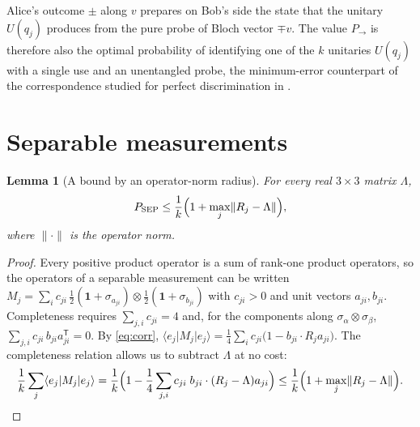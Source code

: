 \documentclass[11pt,a4paper]{article}
\newtheorem{lemma}[theorem]{Lemma}
\theoremstyle{definition}
\theoremstyle{plain}
\newcommand{\ket}[1]{\lvert#1\rangle}
\newcommand{\bra}[1]{\langle#1\rvert}
\newcommand{\norm}[1]{\lVert#1\rVert}
\newcommand{\one}{\mathbf{1}}
\newcommand{\T}{\mathsf{T}}
\newcommand{\Pow}{P_{\to}}
\newcommand{\Psep}{P_{\mathrm{SEP}}}
\begin{document}
Alice's outcome $\pm$ along $v$ prepares on Bob's side the state that the
unitary $U(q_j)$ produces from the pure probe of Bloch vector $\mp v$. The
value $\Pow$ is therefore also the optimal probability of identifying one of
the $k$ unitaries $U(q_j)$ with a single use and an unentangled probe, the
minimum-error counterpart of the correspondence studied for perfect
discrimination in \cite{Bandyopadhyay2011}.

\section{Separable measurements}\label{sec:sep}
\begin{lemma}[A bound by an operator-norm radius]\label{lem:radius}
For every real $3\times3$ matrix $\Lambda$,
\[
\Psep\le\frac1k\Bigl(1+\max_j\norm{R_j-\Lambda}\Bigr),
\]
where $\norm\cdot$ is the operator norm.
\end{lemma}
\begin{proof}
Every positive product operator is a sum of rank-one product operators, so the
operators of a separable measurement can be written
$M_j=\sum_ic_{ji}\,\tfrac12(\one+\sigma_{a_{ji}})\otimes\tfrac12(\one+\sigma_{b_{ji}})$
with $c_{ji}>0$ and unit vectors $a_{ji},b_{ji}$. Completeness requires
$\sum_{j,i}c_{ji}=4$ and, for the components along
$\sigma_\alpha\otimes\sigma_\beta$, $\sum_{j,i}c_{ji}\,b_{ji}a_{ji}^\T=0$. By
\eqref{eq:corr},
$\bra{e_j}M_j\ket{e_j}=\frac14\sum_ic_{ji}\bigl(1-b_{ji}\cdot R_ja_{ji}\bigr)$.
The completeness relation allows us to subtract $\Lambda$ at no cost:
\[
\frac1k\sum_j\bra{e_j}M_j\ket{e_j}
=\frac1k\Bigl(1-\frac14\sum_{j,i}c_{ji}\;b_{ji}\cdot(R_j-\Lambda)a_{ji}\Bigr)
\le\frac1k\Bigl(1+\max_j\norm{R_j-\Lambda}\Bigr).\qedhere
\]
\end{proof}
\end{document}

